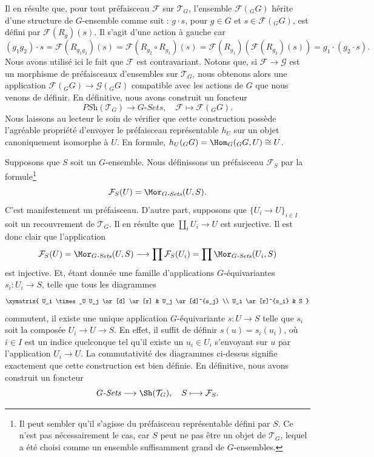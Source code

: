 \medskip\noindent
Il en résulte que, pour tout préfaisceau $\mathcal{F}$ sur $\mathcal{T}_G$,
l’ensemble $\mathcal{F}({}_GG)$ hérite d’une structure de $G$-ensemble
comme suit : $g \cdot s$, pour $g \in G$ et $s \in \mathcal{F}({}_GG)$,
est défini par $\mathcal{F}(R_g)(s)$. Il s’agit d’une action à gauche
car
$$
(g_1g_2) \cdot s  = \mathcal{F}(R_{g_1g_2})(s) =
\mathcal{F}(R_{g_2}\circ R_{g_1})(s) =
\mathcal{F}(R_{g_1})( \mathcal{F}(R_{g_2})(s)) =
g_1 \cdot (g_2 \cdot s).
$$
Nous avons utilisé ici le fait que $\mathcal{F}$
est contravariant. Notons que, si $\mathcal{F} \to \mathcal{G}$
est un morphisme de préfaisceaux d’ensembles sur $\mathcal{T}_G$,
nous obtenons alors une application $\mathcal{F}({}_GG) \to \mathcal{G}({}_GG)$
compatible avec les actions de $G$ que nous venons de définir.
En définitive, nous avons construit un foncteur
$$
\textit{PSh}(\mathcal{T}_G)
\longrightarrow
G\textit{-Sets}, \quad
\mathcal{F}
\longmapsto
\mathcal{F}({}_GG).
$$
Nous laissons au lecteur le soin de vérifier que cette construction
possède l’agréable propriété d’envoyer le préfaisceau représentable
$h_U$ sur un objet canoniquement isomorphe à $U$.
En formule, $h_U({}_GG) = \Hom_G({}_GG, U) \cong U$.

\medskip\noindent
Supposons que $S$ soit un $G$-ensemble. Nous définissons un préfaisceau
$\mathcal{F}_S$ par la formule\footnote{Il peut sembler qu’il s’agisse du
préfaisceau représentable défini par $S$. Ce n’est pas nécessairement le cas,
car $S$ peut ne pas être un objet de $\mathcal{T}_G$, lequel a été choisi
comme un ensemble suffisamment grand de $G$-ensembles.}
$$
\mathcal{F}_S(U)
=
\Mor_{G\textit{-Sets}}(U, S).
$$
C’est manifestement un préfaisceau. D’autre part, supposons que
$\{U_i \to U\}_{i\in I}$ soit un recouvrement de $\mathcal{T}_G$.
Il en résulte que $\coprod_i U_i \to U$ est surjective. Il est donc
clair que l’application
$$
\mathcal{F}_S(U)
=
\Mor_{G\textit{-Sets}}(U, S)
\longrightarrow
\prod \mathcal{F}_S(U_i)
=
\prod \Mor_{G\textit{-Sets}}(U_i, S)
$$
est injective. Et, étant donnée une famille d’applications
$G$-équivariantes $s_i : U_i \to S$, telle que tous les diagrammes
$$
\xymatrix{
U_i \times_U U_j \ar[d] \ar[r]
&
U_j \ar[d]^{s_j}
\\
U_i \ar[r]^{s_i}
&
S
}
$$
commutent, il existe une unique application $G$-équivariante
$s : U \to S$ telle que $s_i$ soit la composée
$U_i \to U \to S$. En effet, il suffit de définir $s(u) = s_i(u_i)$,
où $i\in I$ est un indice quelconque tel qu’il existe un
$u_i \in U_i$ s’envoyant sur $u$ par l’application $U_i \to U$.
La commutativité des diagrammes ci-dessus signifie exactement
que cette construction est bien définie. En définitive, nous avons
construit un foncteur
$$
G\textit{-Sets}
\longrightarrow
\Sh(\mathcal{T}_G), \quad
S
\longmapsto
\mathcal{F}_S
.
$$

